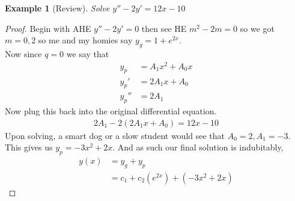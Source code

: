 \documentclass[oneside,11pt,pdftex,final]{book}%
\numberwithin{equation}{section}
\newtheorem{example}[theorem]{Example}
\numberwithin{section}{chapter}
\numberwithin{equation}{chapter}
\begin{document}
\begin{example}[Review]
	Solve $y''-2y'=12x-10$
\end{example}
\begin{proof}
	Begin with AHE $ y''-2y'=0 $ then see HE $ m^2-2m=0 $ so we got $ m= 0, 2$ so me and my homies say $ y_g=1+e^{2x} $.\\
	Now since $ q=0 $ we say that
	\begin{align*}
		  y_p&=A_1x^2+A_0x\\
		  y_p'&=2A_1x+A_0\\
		  y_p''&=2A_1
	\end{align*}
Now plug this back into the original differential equation.
\begin{align*}
	2A_1-2(2A_1x+A_0)=12x-10
\end{align*}
Upon solving, a smart dog or a slow student would see that $ A_0=2, A_1=-3 $. This gives us $ y_p=-3x^2+2x $. And as such our final solution is indubitably,
\begin{align*}
	y(x)&=y_g+y_p\\
	&=c_1+c_2(e^{2x})+(-3x^2+2x)
\end{align*} 
\end{proof}
\end{document}
